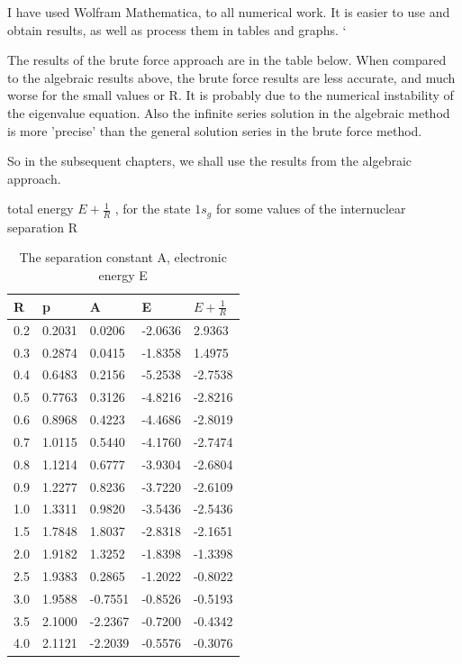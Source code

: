 I have used Wolfram Mathematica, to all numerical work. It is easier to use and obtain results, as well as process them in tables and graphs. `


The results of the brute force approach are in the table below. When compared to the algebraic results above, the brute force results are less accurate, and much worse for the small values or R.  It is probably due to the numerical instability of the eigenvalue equation. Also the infinite series solution in the algebraic method is more 'precise' than the general solution series in the brute force method.

So in the subsequent chapters, we shall use the results from the algebraic approach.

  \begin{table}[ht]
      \caption{ The separation constant A, electronic energy E}{ total energy $ E + \frac{1}{R} $ , for the state $ 1s_g $}{ for some values of the internuclear separation R}
\centering
		\begin{tabular}{ m{6em} m{6em}  m{6em}  m{6em} m{6em} }
		\hline
		    R & p & A & E & $ E + \frac{1}{R} $ \\ \hline \hline
        0.2 & 0.2031 & 0.0206 & -2.0636 & 2.9363 \\
        0.3 & 0.2874 & 0.0415 & -1.8358 & 1.4975 \\
        0.4 & 0.6483 & 0.2156 & -5.2538 & -2.7538 \\
        0.5 & 0.7763 & 0.3126 & -4.8216 & -2.8216 \\
        0.6 & 0.8968 & 0.4223 & -4.4686 & -2.8019 \\
        0.7 & 1.0115 & 0.5440 & -4.1760 & -2.7474 \\
        0.8 & 1.1214 & 0.6777 & -3.9304 & -2.6804 \\
        0.9 & 1.2277 & 0.8236 & -3.7220 & -2.6109 \\
        1.0 & 1.3311 & 0.9820 & -3.5436 & -2.5436 \\
        1.5 & 1.7848 & 1.8037 & -2.8318 & -2.1651 \\
        2.0 & 1.9182 & 1.3252 & -1.8398 & -1.3398 \\
        2.5 & 1.9383 & 0.2865 & -1.2022 & -0.8022 \\
        3.0 & 1.9588 & -0.7551 & -0.8526 & -0.5193 \\
        3.5 & 2.1000 & -2.2367 & -0.7200 & -0.4342 \\
        4.0 & 2.1121 & -2.2039 & -0.5576 & -0.3076 \\

\end{tabular}
\end{table}
